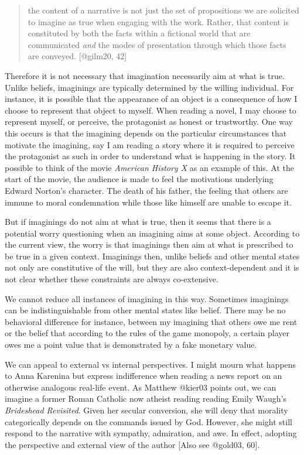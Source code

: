 \documentclass[
  letterpaper,
  DIV=11,
  numbers=noendperiod]{scrartcl}
\theoremstyle{remark}
\begin{document}
\begin{quote}
the content of a narrative is not just the set of propositions we are
solicited to imagine as true when engaging with the work. Rather, that
content is constituted by both the facts within a fictional world that
are communicated \emph{and} the modes of presentation through which
those facts are conveyed. {[}@gilm20, 42{]}
\end{quote}

Therefore it is not necessary that imagination necessarily aim at what
is true. Unlike beliefs, imaginings are typically determined by the
willing individual. For instance, it is possible that the appearance of
an object is a consequence of how I choose to represent that object to
myself. When reading a novel, I may choose to represent myself, or
perceive, the protagonist as honest or trustworthy. One way this occurs
is that the imagining depends on the particular circumstances that
motivate the imagining, say I am reading a story where it is required to
perceive the protagonist as such in order to understand what is
happening in the story. It possible to think of the movie \emph{American
History X} as an example of this. At the start of the movie, the
audience is made to feel the motivations underlying Edward Norton's
character. The death of his father, the feeling that others are immune
to moral condemnation while those like himself are unable to escape it.

But if imaginings do not aim at what is true, then it seems that there
is a potential worry questioning when an imagining aims at some object.
According to the current view, the worry is that imaginings then aim at
what is prescribed to be true in a given context. Imaginings then,
unlike beliefs and other mental states not only are constitutive of the
will, but they are also context-dependent and it is not clear whether
these constraints are always co-extensive.

We cannot reduce all instances of imagining in this way. Sometimes
imaginings can be indistinguishable from other mental states like
belief. There may be no behavioral difference for instance, between my
imagining that others owe me rent or the belief that according to the
rules of the game monopoly, a certain player owes me a point value that
is demonstrated by a fake monetary value.

We can appeal to external vs internal perspectives. I might mourn what
happens to Anna Karenina but express indifference when reading a news
report on an otherwise analogous real-life event. As Matthew @kier03
points out, we can imagine a former Roman Catholic now atheist reading
reading Emily Waugh's \emph{Brideshead Revisited}. Given her secular
conversion, she will deny that morality categorically depends on the
commands issued by God. However, she might still respond to the
narrative with sympathy, admiration, and awe. In effect, adopting the
perspective and external view of the author {[}Also see @gold03, 60{]}.
\end{document}
